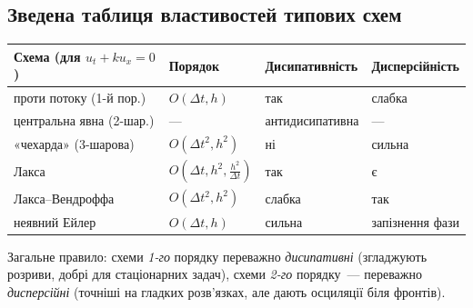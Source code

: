 \documentclass[12pt,a4paper]{article}
\theoremstyle{definition}
\theoremstyle{plain}
\begin{document}
\subsection{Зведена таблиця властивостей типових схем}
\begin{center}
\renewcommand{\arraystretch}{1.35}
\begin{tabular}{@{}p{4.6cm}p{2.7cm}p{2.5cm}p{2.5cm}@{}}
\toprule
\textbf{Схема (для $u_t+ku_x=0$)} & \textbf{Порядок} & \textbf{Дисипа\-тивність} & \textbf{Дисперсій\-ність}\\
\midrule
проти потоку (1-й пор.) & $O(\Delta t,h)$ & так & слабка\\
центральна явна (2-шар.) & --- & анти\-дисипативна & ---\\
«чехарда» (3-шарова) & $O(\Delta t^2,h^2)$ & ні & сильна\\
Лакса & $O(\Delta t,h^2,\tfrac{h^2}{\Delta t})$ & так & є\\
Лакса--Вендроффа & $O(\Delta t^2,h^2)$ & слабка & так\\
неявний Ейлер & $O(\Delta t,h)$ & сильна & запізнення фази\\
\bottomrule
\end{tabular}
\end{center}
\noindent\small Загальне правило: схеми \emph{1-го} порядку
переважно \emph{дисипативні} (згладжують розриви, добрі для стаціонарних
задач), схеми \emph{2-го} порядку~--- переважно \emph{дисперсійні}
(точніші на гладких розв'язках, але дають осциляції біля фронтів).

\newpage
\end{document}
